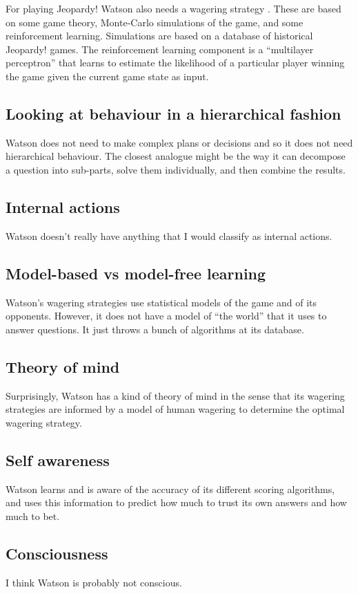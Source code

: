 \documentclass[10pt,a4paper]{article}
\newcommand{\nquote}[1]{``{#1}''}
\begin{document}
For playing Jeopardy! Watson also needs a wagering strategy \cite{watsonwagering}. These are based on some game theory, Monte-Carlo simulations of the game, and some reinforcement learning. Simulations are based on a database of historical Jeopardy! games. The reinforcement learning component is a \nquote{multilayer perceptron} that learns to estimate the likelihood of a particular player winning the game given the current game state as input.

\subsection{Looking at behaviour in a hierarchical fashion}
Watson does not need to make complex plans or decisions and so it does not need hierarchical behaviour. The closest analogue might be the way it can decompose a question into sub-parts, solve them individually, and then combine the results.

\subsection{Internal actions}
Watson doesn't really have anything that I would classify as internal actions.

\subsection{Model-based vs model-free learning}
Watson's wagering strategies use statistical models of the game and of its opponents. However, it does not have a model of \nquote{the world} that it uses to answer questions. It just throws a bunch of algorithms at its database.

\subsection{Theory of mind}
Surprisingly, Watson has a kind of theory of mind in the sense that its wagering strategies are informed by a model of human wagering to determine the optimal wagering strategy.

\subsection{Self awareness}
Watson learns and is aware of the accuracy of its different scoring algorithms, and uses this information to predict how much to trust its own answers and how much to bet.

\subsection{Consciousness}
I think Watson is probably not conscious.
\end{document}
